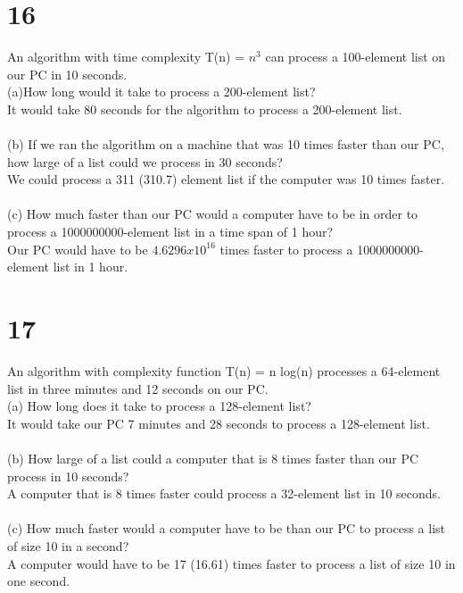 \documentclass{article}
\begin{document}
\section*{16}
    \item An algorithm with time complexity T(n) = $n^{3}$ can process a 100-element list on our PC in 10 seconds.
    \\ (a)How long would it take to process a 200-element list?
    \\ It would take 80 seconds for the algorithm to process a 200-element list.
    \\
    \\ (b) If we ran the algorithm on a machine that was 10 times faster than our PC, how large of a list could we process in 30 seconds?
    \\We could process a 311 (310.7) element list if the computer was 10 times faster.
    \\
    \\ (c) How much faster than our PC would a computer have to be in order to process a 1000000000-element list in a time span of 1 hour?
    \\Our PC would have to be $4.6296x10^{16}$ times faster to process a 1000000000-element list in 1 hour.
    \\
        \begin{shaded} 
        \end{shaded} 




\section*{17}
    \item An algorithm with complexity function T(n) = n log(n) processes a 64-element list in three minutes and 12 seconds on our PC.
    \\ (a) How long does it take to process a 128-element list?
    \\It would take our PC 7 minutes and 28 seconds to process a 128-element list.
    \\
    \\ (b) How large of a list could a computer that is 8 times faster than our PC process in 10 seconds?
    \\ A computer that is 8 times faster could process a 32-element list in 10 seconds.
    \\
    \\ (c) How much faster would a computer have to be than our PC to process a list of size 10 in a second?
    \\A computer would have to be 17 (16.61) times faster to process a list of size 10 in one second.
    
\end{document}
